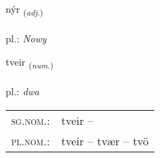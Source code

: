 \documentclass[frontgrid, backgrid]{flacards}\usepackage[]{graphicx}\usepackage[]{xcolor}
\begin{document}
{nýr \small{\textsubscript{(\textit{adj.})}} \\[1ex] %
\textphonetic{[niːr]} \\
pl.: \emph{Nowy} \\  [2ex]
\renewcommand*{\arraystretch}{0.8}
}

\renewcommand{\flhead}{\vskip5pt \fboxsep=0pt {\small\bfseries\footnotesize Töluorð | Numeral}}
\renewcommand{\fcfoot}{\vskip5pt \fboxsep=0pt \hspace{2pt}{\small\bfseries\footnotesize 1K}}

\renewcommand{\blhead}{\vskip5pt {\small\bfseries\footnotesize Töluorð | Numeral }}
\renewcommand{\bcfoot}{\vskip5pt \hspace{2pt}{\small\bfseries\footnotesize 1K}}


{tveir \small{\textsubscript{(\textit{num.})}} \\[1ex] %
\textphonetic{[tʰveiːr]} \\
pl.: \emph{dwa} \\  [2ex]
\renewcommand*{\arraystretch}{0.8}
\begin{tabular}{ll}
\textsc{sg.nom.}: & tveir  -- \\ 
\textsc{pl.nom.}: & tveir -- tvær -- tvö
\end{tabular}
}

\renewcommand{\flhead}{\vskip5pt \fboxsep=0pt {\small\bfseries\footnotesize Sagnorð | Verb}}
\renewcommand{\fcfoot}{\vskip5pt \fboxsep=0pt \hspace{2pt}{\small\bfseries\footnotesize 1K}}

\renewcommand{\blhead}{\vskip5pt {\small\bfseries\footnotesize Sagnorð | Verb }}
\renewcommand{\bcfoot}{\vskip5pt \hspace{2pt}{\small\bfseries\footnotesize 1K}}
\end{document}
